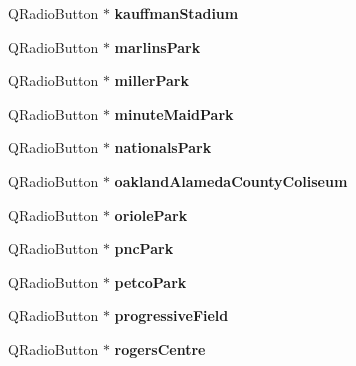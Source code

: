\begin{DoxyCompactItemize}
Q\+Radio\+Button $\ast$ {\bfseries kauffman\+Stadium}
\item 
\mbox{\label{class_ui___main_window_a3dc43b37e86bafc8822fc33e781c223d}} 
Q\+Radio\+Button $\ast$ {\bfseries marlins\+Park}
\item 
\mbox{\label{class_ui___main_window_ac00c6bb771aad4cae769f915aa6a6686}} 
Q\+Radio\+Button $\ast$ {\bfseries miller\+Park}
\item 
\mbox{\label{class_ui___main_window_aa1046d4efe58dc634c298b39a023db44}} 
Q\+Radio\+Button $\ast$ {\bfseries minute\+Maid\+Park}
\item 
\mbox{\label{class_ui___main_window_a2115ce0505093c6da56c515880ebebef}} 
Q\+Radio\+Button $\ast$ {\bfseries nationals\+Park}
\item 
\mbox{\label{class_ui___main_window_af16e55d1e18817210d18dd3b8c817939}} 
Q\+Radio\+Button $\ast$ {\bfseries oakland\+Alameda\+County\+Coliseum}
\item 
\mbox{\label{class_ui___main_window_a7b5fcbc84ab66889784b9f1b54e7d51f}} 
Q\+Radio\+Button $\ast$ {\bfseries oriole\+Park}
\item 
\mbox{\label{class_ui___main_window_a3b5b905e41c16c1a834dddfdeb15612d}} 
Q\+Radio\+Button $\ast$ {\bfseries pnc\+Park}
\item 
\mbox{\label{class_ui___main_window_ade3f2d5af76e0a93c5dfce9496600ac9}} 
Q\+Radio\+Button $\ast$ {\bfseries petco\+Park}
\item 
\mbox{\label{class_ui___main_window_ad856c9e2db0295fc1e8b51b27d539329}} 
Q\+Radio\+Button $\ast$ {\bfseries progressive\+Field}
\item 
\mbox{\label{class_ui___main_window_a97f67022b1d4db21ef16fd4ae9320ecf}} 
Q\+Radio\+Button $\ast$ {\bfseries rogers\+Centre}
\item 
\mbox{\label{class_ui___main_window_a605b68cd19b3e89d804dc620a820b877}} 

\end{DoxyCompactItemize}
